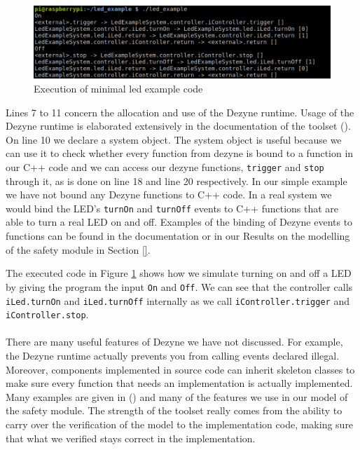 \documentclass[12pt]{scrreprt}
\begin{document}
\begin{figure}[H]
    \centering
    \includegraphics[width=\textwidth]{Figures/theoretical_background/executed.png}
    \caption{Execution of minimal led example code}
    \label{Execution of minimal led example code}
\end{figure}

Lines 7 to 11 concern the allocation and use of the Dezyne runtime. Usage of the Dezyne runtime is elaborated extensively in the documentation of the toolset (\cite{dzndoc}). On line 10 we declare a system object. The system object is useful because we can use it to check whether every function from dezyne is bound to a function in our C++ code and we can access our dezyne functions, \texttt{trigger} and \texttt{stop} through it, as is done on line 18 and line 20 respectively. In our simple example we have not bound any Dezyne functions to C++ code. In a real system we would bind the LED's \texttt{turnOn} and \texttt{turnOff} events to C++ functions that are able to turn a real LED on and off. Examples of the binding of Dezyne events to functions can be found in the documentation or in our Results on the modelling of the safety module in Section \ref{}. 
\par
The executed code in Figure \ref{Execution of minimal led example code} shows how we simulate turning on and off a LED by giving the program the input \texttt{On} and \texttt{Off}. We can see that the controller calls \texttt{iLed.turnOn} and \texttt{iLed.turnOff} internally as we call \texttt{iController.trigger} and \texttt{iController.stop}.
\\\\
There are many useful features of Dezyne we have not discussed. For example, the Dezyne runtime actually prevents you from calling events declared illegal. Moreover, components implemented in source code can inherit skeleton classes to make sure every function that needs an implementation is actually implemented. Many examples are given in (\cite{dzntut}) and many of the features we use in our model of the safety module. The strength of the toolset really comes from the ability to carry over the verification of the model to the implementation code, making sure that what we verified stays correct in the implementation.
\end{document}
